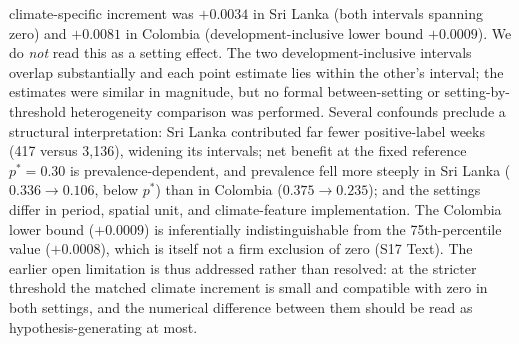 \documentclass[11pt,a4paper]{article}
\begin{document}
climate-specific increment was $+0.0034$ in Sri Lanka (both intervals spanning zero) and $+0.0081$ in
Colombia (development-inclusive lower bound $+0.0009$). We do \emph{not} read this as a setting effect.
The two development-inclusive intervals overlap substantially and each point estimate lies within the
other's interval; the estimates were similar in magnitude, but no formal between-setting or
setting-by-threshold heterogeneity comparison was performed. Several confounds preclude a structural
interpretation: Sri Lanka contributed far fewer positive-label weeks (417 versus 3{,}136), widening
its intervals; net benefit at the fixed reference $p^*=0.30$ is prevalence-dependent, and prevalence
fell more steeply in Sri Lanka ($0.336\to0.106$, below $p^*$) than in Colombia ($0.375\to0.235$); and
the settings differ in period, spatial unit, and climate-feature implementation. The Colombia lower
bound ($+0.0009$) is inferentially indistinguishable from the 75th-percentile value ($+0.0008$), which
is itself not a firm exclusion of zero (S17 Text). The earlier open limitation is thus addressed rather
than resolved: at the stricter threshold the matched climate increment is small and compatible with
zero in both settings, and the numerical difference between them should be read as hypothesis-generating
at most.
\end{document}

